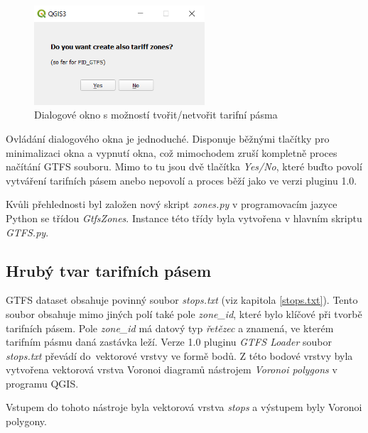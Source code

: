 \begin{figure}[H] \centering
    \includegraphics[width=180pt]{./pictures/dialog.png}
    \caption[Dialogové okno s možností tvořit/netvořit tarifní pásma]{Dialogové okno s možností tvořit/netvořit tarifní pásma}
	\label{fig:dialog}                                
\end{figure}

Ovládání dialogového okna je jednoduché. Disponuje běžnými tlačítky pro mi\-nimalizaci okna a vypnutí okna, což mimochodem
zruší kompletně proces načítání GTFS souboru. Mimo to tu jsou dvě tlačítka \textit{Yes/No}, které buďto povolí vytváření tarifních
pásem anebo nepovolí a proces běží jako ve verzi pluginu 1.0.

Kvůli přehlednosti byl založen nový skript \textit{zones.py} v programovacím jazyce Python se třídou \textit{GtfsZones}. 
Instance této třídy byla vytvořena v hlavním skriptu \textit{GTFS.py}.

\subsection{Hrubý tvar tarifních pásem}
\label{hruby_tvar}

GTFS dataset obsahuje povinný  soubor \textit{stops.txt} (viz kapitola \ref{stops.txt}). Tento soubor obsahuje mimo
jiných polí také pole \textit{zone\_id}, které bylo klíčové při tvorbě tarifních pásem.
Pole \textit{zone\_id} má datový typ \textit{řetězec} a znamená, ve kterém ta\-rifním
pásmu daná zastávka leží. Verze 1.0 pluginu \textit{GTFS Loader} soubor \textit{stops.txt} převádí do~vektorové vrstvy
ve formě bodů. Z této bodové vrstvy byla vytvořena vektorová vrstva Voronoi 
diagramů nástrojem \textit{Voronoi polygons} v programu QGIS. 

Vstupem do tohoto nástroje byla vektorová vrstva \textit{stops} a výstupem byly Voronoi polygony.

